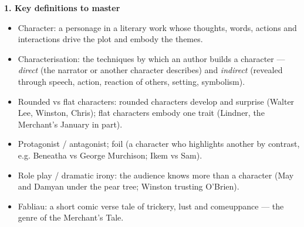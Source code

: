 \documentclass[11pt]{article}
\newcommand{\cle}[1]{{\popxbold\color{popdark}#1}}
\begin{document}
\begin{bilan}

\textbf{1. Key definitions to master}
\begin{itemize}
\item \cle{Character}: a personage in a literary work whose thoughts, words, actions and interactions drive the plot and embody the themes.
\item \cle{Characterisation}: the techniques by which an author builds a character — \emph{direct} (the narrator or another character describes) and \emph{indirect} (revealed through speech, action, reaction of others, setting, symbolism).
\item \cle{Rounded vs flat characters}: rounded characters develop and surprise (Walter Lee, Winston, Chris); flat characters embody one trait (Lindner, the Merchant's January in part).
\item \cle{Protagonist / antagonist}; \cle{foil} (a character who highlights another by contrast, e.g. Beneatha vs George Murchison; Ikem vs Sam).
\item \cle{Role play / dramatic irony}: the audience knows more than a character (May and Damyan under the pear tree; Winston trusting O'Brien).
\item \cle{Fabliau}: a short comic verse tale of trickery, lust and comeuppance — the genre of the Merchant's Tale.
\end{itemize}


\end{bilan}
\end{document}

